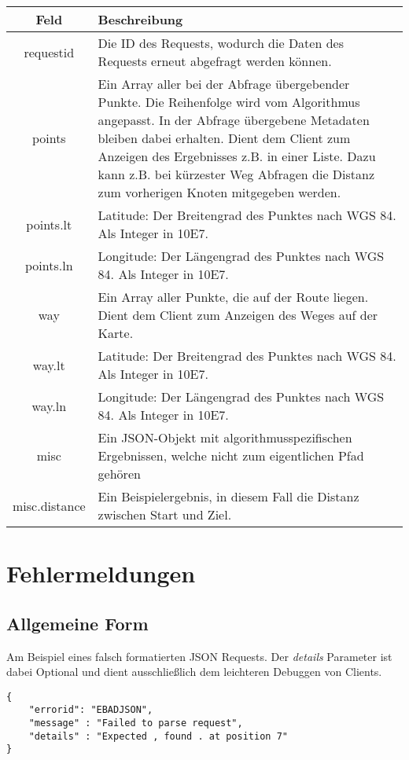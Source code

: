 \documentclass[ngerman,titlepage,parskip=true]{scrartcl}
\begin{document}
		\begin{tabular}{|c|p{12cm}|}
			\hline
			\textbf{Feld} & \textbf{Beschreibung} \\ 
			\hline \hline

			requestid & Die ID des Requests, wodurch die Daten des Requests erneut abgefragt werden können.\\
			\hline
			
			points & Ein Array aller bei der Abfrage übergebender Punkte. Die Reihenfolge wird vom Algorithmus angepasst. In der Abfrage übergebene Metadaten bleiben dabei erhalten. Dient dem Client zum Anzeigen des Ergebnisses z.B. in einer Liste. Dazu kann z.B. bei kürzester Weg Abfragen die Distanz zum vorherigen Knoten mitgegeben werden.\\
			\hline
			
	    	points.lt & Latitude: Der Breitengrad des Punktes nach WGS 84. Als Integer in 10E7.\\ 
	    	\hline
	    	
	    	points.ln & Longitude: Der Längengrad des Punktes nach WGS 84. Als Integer in 10E7.\\
	    	\hline
	    	
	    	way & Ein Array aller Punkte, die auf der Route liegen. Dient dem Client zum Anzeigen des Weges auf der Karte.\\
			\hline
			
	    	way.lt & Latitude: Der Breitengrad des Punktes nach WGS 84. Als Integer in 10E7.\\ 
	    	\hline
	    	
	    	way.ln & Longitude: Der Längengrad des Punktes nach WGS 84. Als Integer in 10E7.\\
	    	\hline
	    	
	    	misc & Ein JSON-Objekt mit algorithmusspezifischen Ergebnissen, welche nicht zum eigentlichen Pfad gehören \\
	    	\hline
	    	
	    	misc.distance & Ein Beispielergebnis, in diesem Fall die Distanz zwischen Start und Ziel.\\
	    	\hline
		\end{tabular}

\section{Fehlermeldungen}
\subsection{Allgemeine Form}
Am Beispiel eines falsch formatierten JSON Requests.
Der \textit{details} Parameter ist dabei Optional und dient ausschließlich dem leichteren Debuggen von 
Clients.
	\begin{lstlisting}
{
	"errorid": "EBADJSON",
	"message" : "Failed to parse request",
	"details" : "Expected , found . at position 7"
}
	\end{lstlisting}
\end{document}
